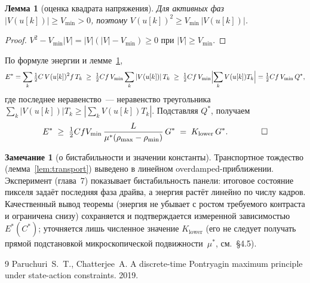 \documentclass[12pt,a4paper]{article}
\theoremstyle{plain}
\newtheorem{lemma}{Лемма}
\theoremstyle{definition}\newtheorem{remark}{Замечание}
\begin{document}
\begin{lemma}[оценка квадрата напряжения]\label{lem:vsq}
Для активных фаз $|V(u[k])|\ge V_{\min}>0$, поэтому $V(u[k])^2\ge V_{\min}\,|V(u[k])|$.
\end{lemma}
\begin{proof}
$V^2-V_{\min}|V|=|V|(|V|-V_{\min})\ge0$ при $|V|\ge V_{\min}$. \end{proof}

\noindent По формуле энергии и лемме~\ref{lem:vsq},
\[
  E^{*}=\sum_k\tfrac12 C\,V(u[k])^2 f\,T_k
       \;\ge\;\tfrac12 C f\,V_{\min}\sum_k |V(u[k])|\,T_k
       \;\ge\;\tfrac12 C f\,V_{\min}\Bigl|\sum_k V(u[k])T_k\Bigr|
       =\tfrac12 C f\,V_{\min}\,Q^{*},
\]
где последнее неравенство~--- неравенство треугольника
$\sum_k|V(u[k])|T_k\ge|\sum_k V(u[k])T_k|$. Подставляя $Q^{*}$, получаем
\[
  E^{*}\;\ge\;\tfrac12 C f V_{\min}\,\frac{L}{\mu^*(\rho_{\max}-\rho_{\min})}\,G^{*}
        \;=\;K_{\mathrm{lower}}\,G^{*}. \qquad\qed
\]

\begin{remark}[о бистабильности и значении константы]\label{rem:bist}
Транспортное тождество (лемма~\ref{lem:transport}) выведено в линейном
overdamped-приближении. Эксперимент (глава~7) показывает бистабильность панели:
итоговое состояние пикселя задаёт последняя фаза драйва, а энергия растёт линейно по
числу кадров. Качественный вывод теоремы (энергия не убывает с ростом требуемого
контраста и ограничена снизу) сохраняется и подтверждается измеренной зависимостью
$E^{*}(C^{*})$; уточняется лишь численное значение $K_{\mathrm{lower}}$ (его не следует
получать прямой подстановкой микроскопической подвижности~$\mu^*$, см.~\S4.5).
\end{remark}

\begin{thebibliography}{9}
Paruchuri~S.~T., Chatterjee~A. A discrete-time Pontryagin maximum principle
under state-action constraints. 2019.
\end{thebibliography}
\end{document}
